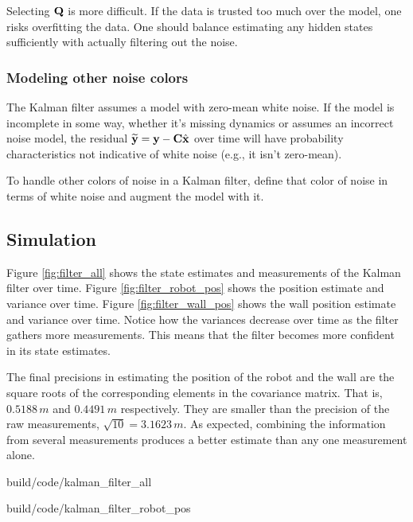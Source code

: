 Selecting $\mathbf{Q}$ is more difficult. If the data is trusted too much over the
model, one risks overfitting the data. One should balance estimating any hidden
\glspl{state} sufficiently with actually filtering out the noise.

\subsubsection{Modeling other noise colors}

The Kalman filter assumes a \gls{model} with zero-mean white noise. If the
\gls{model} is incomplete in some way, whether it's missing dynamics or assumes
an incorrect noise \gls{model}, the residual
$\widetilde{\mathbf{y}} = \mathbf{y} - \mathbf{C}\hat{\mathbf{x}}$ over time will have
probability characteristics not indicative of white noise (e.g., it isn't
zero-mean).

To handle other colors of noise in a Kalman filter, define that color of noise
in terms of white noise and augment the \gls{model} with it.

\subsection{Simulation}
\label{subsec:filter_simulation}

Figure \ref{fig:filter_all} shows the \gls{state} estimates and measurements of
the Kalman filter over time. Figure \ref{fig:filter_robot_pos} shows the
position estimate and variance over time. Figure \ref{fig:filter_wall_pos} shows
the wall position estimate and variance over time. Notice how the variances
decrease over time as the filter gathers more measurements. This means that the
filter becomes more confident in its \gls{state} estimates.

The final precisions in estimating the position of the robot and the wall are
the square roots of the corresponding elements in the covariance matrix. That
is, $0.5188\,m$ and $0.4491\,m$ respectively. They are smaller than the
precision of the raw measurements, $\sqrt{10} = 3.1623\,m$. As expected,
combining the information from several measurements produces a better estimate
than any one measurement alone.

\begin{svg}{build/code/kalman_filter_all}
  \caption{State estimates and measurements with Kalman filter}
  \label{fig:filter_all}
\end{svg}

\begin{svg}{build/code/kalman_filter_robot_pos}
  \caption{Robot position estimate and variance with Kalman filter}
  \label{fig:filter_robot_pos}
\end{svg}

